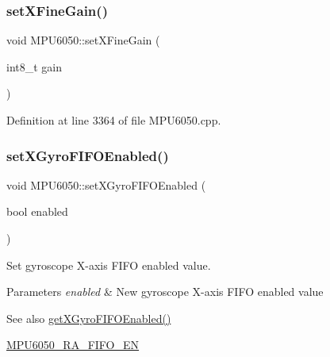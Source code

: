 \subsubsection{\texorpdfstring{setXFineGain()}{setXFineGain()}}
{\footnotesize\ttfamily void M\+P\+U6050\+::set\+X\+Fine\+Gain (\begin{DoxyParamCaption}\item[{int8\+\_\+t}]{gain }\end{DoxyParamCaption})}



Definition at line 3364 of file M\+P\+U6050.\+cpp.


\begin{DoxyCode}{0}

\end{DoxyCode}
\mbox{\label{classMPU6050_a53a03d1f255a62f01375c870cdc85767}} 
\subsubsection{\texorpdfstring{setXGyroFIFOEnabled()}{setXGyroFIFOEnabled()}}
{\footnotesize\ttfamily void M\+P\+U6050\+::set\+X\+Gyro\+F\+I\+F\+O\+Enabled (\begin{DoxyParamCaption}\item[{bool}]{enabled }\end{DoxyParamCaption})}

Set gyroscope X-\/axis F\+I\+FO enabled value. 
\begin{DoxyParams}{Parameters}
{\em enabled} & New gyroscope X-\/axis F\+I\+FO enabled value \\
\hline
\end{DoxyParams}
\begin{DoxySeeAlso}{See also}
\mbox{\hyperlink{classMPU6050_ada9a553176b57815f23fb7d71bb85c9d}{get\+X\+Gyro\+F\+I\+F\+O\+Enabled()}} 

\mbox{\hyperlink{MPU6050_8h_a1166fe50f4792f3266e15dc3273e375d}{M\+P\+U6050\+\_\+\+R\+A\+\_\+\+F\+I\+F\+O\+\_\+\+EN}} 
\end{DoxySeeAlso}


